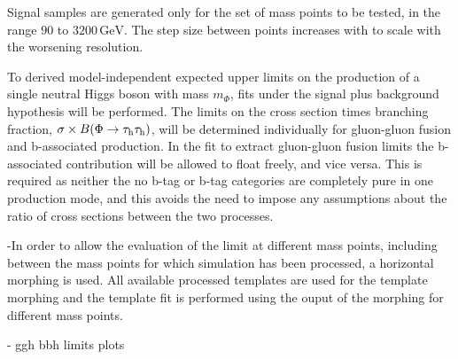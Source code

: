 Signal samples are generated only for the set of \ma mass points to be tested, in the range $90$ to $3200\,\mathrm{GeV}$. The step size between points increases with \ma to scale with the worsening \mttot resolution. 


To derived model-independent expected upper limits on the production of a single neutral Higgs boson with mass $m_{\Phi}$, fits under the signal plus background hypothesis will be performed. The limits on the cross section times branching fraction, $\sigma\times B(\Phi\rightarrow\tau_{\rm h}\tau_{\rm h})$, will be determined individually for gluon-gluon fusion and b-associated production. In the fit to extract gluon-gluon fusion limits the b-associated contribution will be allowed to float freely, and vice versa. This is required as neither the no b-tag or b-tag categories are completely pure in one production mode, and this avoids the need to impose any assumptions about the ratio of cross sections between the two processes.

-In order to allow the evaluation of the limit at different mass points, including between the mass points for which simulation has been processed, a horizontal morphing \cite{READ1999357} is used. All available processed templates are used for the template morphing and the template fit is performed using the ouput of the morphing for different mass points.

- ggh bbh limits plots




